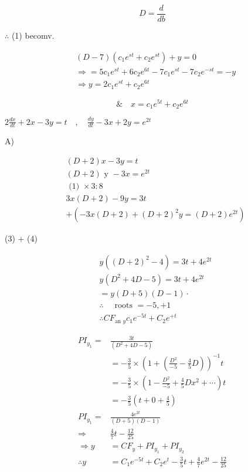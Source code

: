 \documentclass[12pt, a4paper]{article}
\begin{document}
$$
D=\frac{d}{d b}
$$

$\therefore$ (1) becomv.

$$
\begin{aligned}
&(D-7)\left(c_{1} e^{s t}+c_{2} e^{s t}\right)+y=0 \\
& \Rightarrow=5 c_{1} e^{s t}+6 c_{2} e^{6 t}-7 c_{1} e^{s t}-7 c_{2} e^{-s t}=-y \\
& \Rightarrow y=2 c_{1} e^{s t}+c_{2} e^{6 t}
\end{aligned}
$$

$$
\& \quad x=c_{1} e^{5 t}+c_{2} e^{6 t}
$$

$2 \frac{d x}{d t}+2 x-3 y=t \quad, \quad \frac{d y}{d t}-3 x+2 y=e^{2 t}$

A)


\begin{align*}
& (D+2) x-3 y=t \\
& (D+2) \text { y }-3 x=e^{2 t}  \tag{2}\\
& \text { (1) } \times 3: 8 \\
& 3 x(D+2)-9 y=3 t  \tag{3}\\
& +\left(-3 x(D+2)+(D+2)^{2} y=(D+2) e^{2 t}\right) \tag{9}
\end{align*}


(3) + (4)

$$
\begin{aligned}
& y\left((D+2)^{2}-4\right)=3 t+4 e^{2 t} \\
& y\left(D^{2}+4 D-5\right)=3 t+4 e^{2 t} \\
& =y(D+5)(D-1) \cdot \\
& \therefore \quad \text { roots }=-5,+1 \\
& \therefore C F_{\text {an } y} c_{1} e^{-5 t}+C_{2} e^{+t}
\end{aligned}
$$

$$
\begin{aligned}
P I_{y_{1}}= & \frac{3 t}{\left(D^{2}+4 D-5\right)} \\
& =-\frac{3}{5} \times\left(1+\left(\frac{D^{2}}{-5}-\frac{4}{5} D\right)\right)^{-1} t \\
& =-\frac{3}{5} \times\left(1-\frac{D^{2}}{-5}+\frac{4}{5} D x^{2}+\cdots\right) t \\
& =-\frac{3}{5}\left(t+0+\frac{4}{5}\right) \\
P I_{y_{1}}= & \frac{4 e^{2 t}}{(D+5)(D-1)} \\
\Rightarrow & \frac{4}{7} t-\frac{12}{25} \\
\Rightarrow y & =C F_{y}+P I_{y_{1}}+P I_{y_{2}} \\
\therefore y & =C_{1} e^{-5 t}+C_{2} e^{t}-\frac{3}{5} t+\frac{4}{7} e^{2 t}-\frac{12}{25}
\end{aligned}
$$
\end{document}
